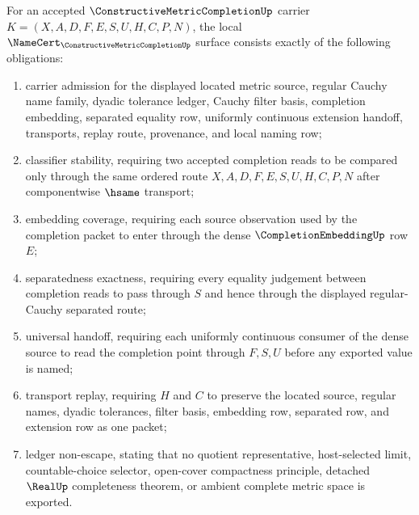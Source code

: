 \begin{theorem}
\label{thm:constructive-metric-completion-namecert-obligations}
For an accepted $\ConstructiveMetricCompletionUp$ carrier $K=(X,A,D,F,E,S,U,H,C,P,N)$, the local $\NameCert_{\ConstructiveMetricCompletionUp}$ surface consists exactly of the following obligations:
\begin{enumerate}
\item carrier admission for the displayed located metric source, regular Cauchy name family, dyadic tolerance ledger, Cauchy filter basis, completion embedding, separated equality row, uniformly continuous extension handoff, transports, replay route, provenance, and local naming row;
\item classifier stability, requiring two accepted completion reads to be compared only through the same ordered route $X,A,D,F,E,S,U,H,C,P,N$ after componentwise $\hsame$ transport;
\item embedding coverage, requiring each source observation used by the completion packet to enter through the dense $\CompletionEmbeddingUp$ row $E$;
\item separatedness exactness, requiring every equality judgement between completion reads to pass through $S$ and hence through the displayed regular-Cauchy separated route;
\item universal handoff, requiring each uniformly continuous consumer of the dense source to read the completion point through $F,S,U$ before any exported value is named;
\item transport replay, requiring $H$ and $C$ to preserve the located source, regular names, dyadic tolerances, filter basis, embedding row, separated row, and extension row as one packet;
\item ledger non-escape, stating that no quotient representative, host-selected limit, countable-choice selector, open-cover compactness principle, detached $\RealUp$ completeness theorem, or ambient complete metric space is exported.
\end{enumerate}
\end{theorem}
